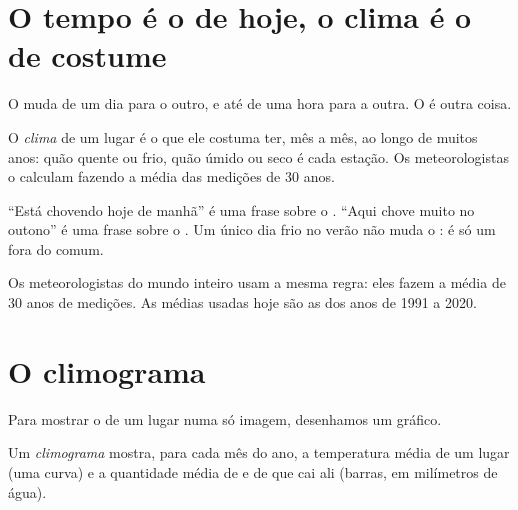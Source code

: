 \section{O tempo é o de hoje, o clima é o de costume}

O  muda de um dia para o outro, e até de uma hora para a outra. O
 é outra coisa.

\begin{definition}[Clima]\label{def:g5:weather-and-climate:climate}
O \emph{clima} de um lugar é o  que ele costuma ter, mês
a mês, ao longo de muitos anos: quão quente ou frio, quão úmido ou seco é
cada estação. Os meteorologistas o calculam fazendo a média das medições
de 30 anos.
\end{definition}

``Está chovendo hoje de manhã'' é uma frase sobre o . ``Aqui chove
muito no outono'' é uma frase sobre o . Um único dia frio no verão
não muda o : é só um  fora do comum.

Os meteorologistas do mundo inteiro usam a mesma regra: eles fazem a média
de 30 anos de medições. As médias usadas hoje são as dos anos de 1991 a
2020.

\section{O climograma}

Para mostrar o  de um lugar numa só imagem, desenhamos um gráfico.

\begin{definition}[Climograma]\label{def:g5:weather-and-climate:climate-chart}
Um \emph{climograma} mostra, para cada mês do ano, a
temperatura média de um lugar (uma curva) e a quantidade média de  e
de  que cai ali (barras, em milímetros de água).
\end{definition}

